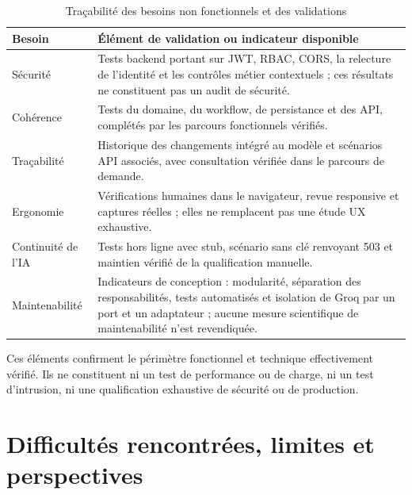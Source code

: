 \begin{table}[htbp]
\centering
\small
\caption{Traçabilité des besoins non fonctionnels et des validations}
\label{tab:03-tracabilite-non-fonctionnelle}
\begingroup
\setlength{\tabcolsep}{5pt}
\setlength{\arrayrulewidth}{0.3pt}
\renewcommand{\arraystretch}{1.14}
\newcommand{\TCell}[1]{{\raggedright #1\par}}
\begin{tabular}{@{}p{}p{}@{}}
\hline
\TCell{\textbf{Besoin}} & \TCell{\textbf{Élément de validation ou indicateur disponible}}\\ \hline
\TCell{Sécurité} & \TCell{Tests backend portant sur JWT, RBAC, CORS, la relecture de l'identité et les contrôles métier contextuels ; ces résultats ne constituent pas un audit de sécurité.}\\ \hline
\TCell{Cohérence} & \TCell{Tests du domaine, du workflow, de persistance et des API, complétés par les parcours fonctionnels vérifiés.}\\ \hline
\TCell{Traçabilité} & \TCell{Historique des changements intégré au modèle et scénarios API associés, avec consultation vérifiée dans le parcours de demande.}\\ \hline
\TCell{Ergonomie} & \TCell{Vérifications humaines dans le navigateur, revue responsive et captures réelles ; elles ne remplacent pas une étude UX exhaustive.}\\ \hline
\TCell{Continuité de l'IA} & \TCell{Tests hors ligne avec stub, scénario sans clé renvoyant 503 et maintien vérifié de la qualification manuelle.}\\ \hline
\TCell{Maintenabilité} & \TCell{Indicateurs de conception : modularité, séparation des responsabilités, tests automatisés et isolation de Groq par un port et un adaptateur ; aucune mesure scientifique de maintenabilité n'est revendiquée.}\\ \hline
\end{tabular}
\endgroup
\end{table}
\FloatBarrier

Ces éléments confirment le périmètre fonctionnel et technique effectivement vérifié. Ils ne constituent ni un test de performance ou de charge, ni un test d'intrusion, ni une qualification exhaustive de sécurité ou de production.

\section{Difficultés rencontrées, limites et perspectives}
\label{sec:03-limites}

